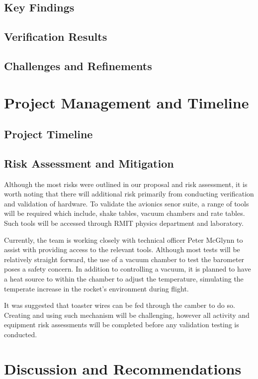 \subsection{Key Findings}
\subsection{Verification Results}
\subsection{Challenges and Refinements}

\section{Project Management and Timeline}
\subsection{Project Timeline}

\subsection{Risk Assessment and Mitigation}
Although the most risks were outlined in our proposal and risk assessment, it is worth noting that there will additional risk primarily from conducting verification and validation of hardware. To validate the avionics senor suite, a range of tools will be required which include, shake tables, vacuum chambers and rate tables. Such tools will be accessed through RMIT physics department and laboratory. 

Currently, the team is working closely with technical officer Peter McGlynn to assist with providing access to the relevant tools. Although most tests will be relatively straight forward, the use of a vacuum chamber to test the barometer poses a safety concern. In addition to controlling a vacuum, it is planned to have a heat source to within the chamber to adjust the temperature, simulating the temperate increase in the rocket’s environment during flight. 

It was suggested that toaster wires can be fed through the camber to do so. Creating and using such mechanism will be challenging, however all activity and equipment risk assessments will be completed before any validation testing is conducted.  

\section{Discussion and Recommendations}

